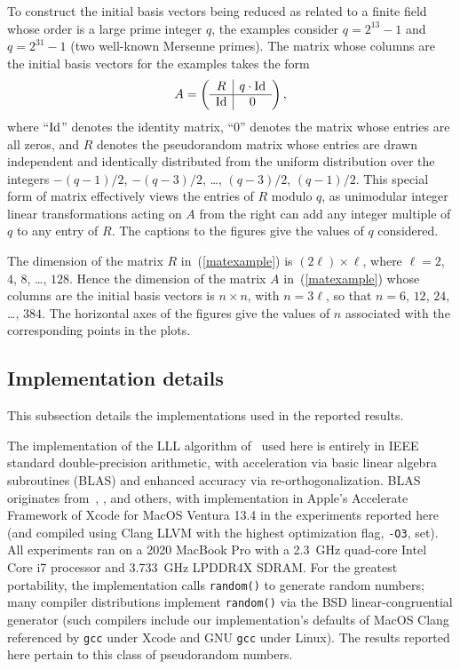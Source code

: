 \documentclass{article}
\def\Id{\rm Id}
\begin{document}
To construct the initial basis vectors being reduced
as related to a finite field whose order is a large prime integer $q$,
the examples consider $q = 2^{13} - 1$ and $q = 2^{31} - 1$
(two well-known Mersenne primes).
The matrix whose columns are the initial basis vectors for the examples
takes the form
%
\begin{equation}
\label{matexample}
A = \left( \begin{array}{c|c} R & q \cdot \Id \\\hline
                              \Id & 0 \end{array} \right),
\end{equation}
%
where ``$\Id$'' denotes the identity matrix,
``$0$'' denotes the matrix whose entries are all zeros,
and $R$ denotes the pseudorandom matrix whose entries are drawn
independent and identically distributed from the uniform distribution
over the integers $-(q-1)/2$, $-(q-3)/2$, \dots, $(q-3)/2$, $(q-1)/2$.
This special form of matrix effectively views the entries of $R$ modulo $q$,
as unimodular integer linear transformations acting on $A$ from the right
can add any integer multiple of $q$ to any entry of $R$.
The captions to the figures give the values of $q$ considered.

The dimension of the matrix $R$ in~(\ref{matexample}) is
$(2 \ell) \times \ell$, where $\ell = 2$, $4$, $8$, \dots, $128$.
Hence the dimension of the matrix $A$ in~(\ref{matexample}) whose columns
are the initial basis vectors is $n \times n$, with $n = 3 \ell$,
so that $n = 6$, $12$, $24$, \dots, $384$.
The horizontal axes of the figures give the values of $n$
associated with the corresponding points in the plots.

\subsection{Implementation details}
\label{implementation}

This subsection details the implementations used in the reported results.

The implementation of the LLL algorithm of~\cite{lenstra-lenstra-lovasz}
used here is entirely in IEEE standard double-precision arithmetic,
with acceleration via basic linear algebra subroutines (BLAS)
and enhanced accuracy via re-orthogonalization.
BLAS originates from~\cite{lawson-hanson-kincaid-krogh},
\cite{blas}, and others, with implementation in Apple's Accelerate Framework
of Xcode for MacOS Ventura 13.4 in the experiments reported here
(and compiled using Clang LLVM with the highest optimization flag,
{\tt -O3}, set). All experiments ran on a 2020 MacBook Pro
with a 2.3~GHz quad-core Intel Core i7 processor
and 3.733~GHz LPDDR4X SDRAM.
For the greatest portability, the implementation calls {\tt random()}
to generate random numbers; many compiler distributions
implement {\tt random()} via the BSD linear-congruential generator
(such compilers include our implementation's defaults
of MacOS Clang referenced by {\tt gcc} under Xcode
and GNU {\tt gcc} under Linux). The results reported here pertain
to this class of pseudorandom numbers.
\end{document}
